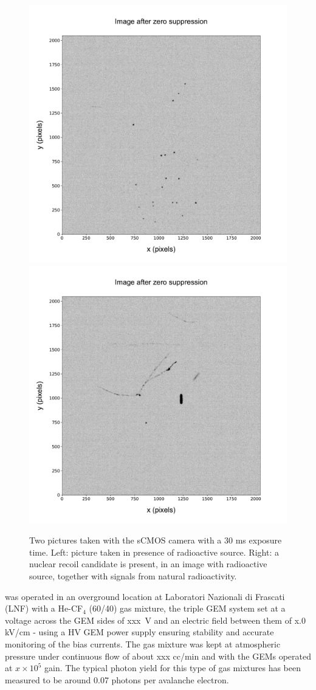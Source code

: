 \documentclass[12pt]{iopart}
\begin{document}
 
\begin{figure}[ht]
  \begin{center}
    \includegraphics[width=0.49\linewidth]{figures/pic_run01843_ev93_oriIma_paper}
    \includegraphics[width=0.49\linewidth]{figures/pic_run02317_ev342_oriIma_paper}
    \caption{Two pictures taken with the sCMOS camera with a 30 ms
      exposure time. Left: picture taken in presence of \fe radioactive
      source. Right: a nuclear recoil candidate is present, in an image
      with \ambe radioactive source, together with signals from natural
      radioactivity.      \label{fig:signals}}
  \end{center}
\end{figure}

\lemon was operated in an overground location at Laboratori Nazionali di Frascati (LNF) with  a He-CF$_4$ (60/40) gas mixture, the triple GEM system set at a voltage across the GEM sides of xxx~V and an electric field between them of x.0 kV/cm - using a HV GEM power supply \cite{Corradi:2007df} ensuring stability and accurate monitoring of the bias currents. The gas mixture was kept at atmospheric pressure under continuous flow of about xxx cc/min and with the GEMs operated at $ x\times10^5$ gain. The typical photon yield for this  type of gas mixtures has been measured to be around  0.07 photons per avalanche electron.\cite{bib:jinst_orange1, bib:roby, bib:tesinatalia}
\end{document}
